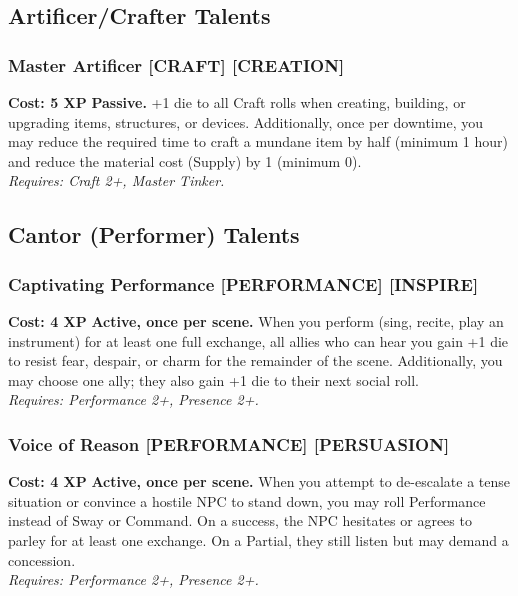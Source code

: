 \subsection*{Artificer/Crafter Talents}
\label{sec:major-artificer}

\subsubsection*{Master Artificer \textnormal{[CRAFT] [CREATION]}}
\label{talent:master-artificer}
\textbf{Cost: 5 XP} \textbf{Passive.} +1 die to all Craft rolls when creating, building, or upgrading items, structures, or devices. Additionally, once per downtime, you may reduce the required time to craft a mundane item by half (minimum 1 hour) and reduce the material cost (Supply) by 1 (minimum 0). \\
\textit{Requires: Craft 2+, Master Tinker.}

\subsection*{Cantor (Performer) Talents}
\label{sec:major-cantor}

\subsubsection*{Captivating Performance \textnormal{[PERFORMANCE] [INSPIRE]}}
\label{talent:captivating-performance}
\textbf{Cost: 4 XP} \textbf{Active, once per scene.} When you perform (sing, recite, play an instrument) for at least one full exchange, all allies who can hear you gain +1 die to resist fear, despair, or charm for the remainder of the scene. Additionally, you may choose one ally; they also gain +1 die to their next social roll. \\
\textit{Requires: Performance 2+, Presence 2+.}

\subsubsection*{Voice of Reason \textnormal{[PERFORMANCE] [PERSUASION]}}
\label{talent:voice-of-reason}
\textbf{Cost: 4 XP} \textbf{Active, once per scene.} When you attempt to de-escalate a tense situation or convince a hostile NPC to stand down, you may roll Performance instead of Sway or Command. On a success, the NPC hesitates or agrees to parley for at least one exchange. On a Partial, they still listen but may demand a concession. \\
\textit{Requires: Performance 2+, Presence 2+.}

